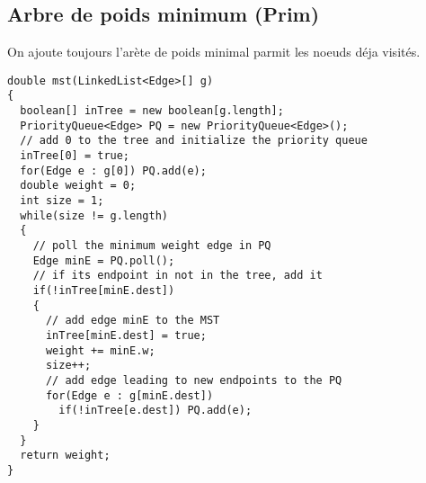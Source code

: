 \subsection{Arbre de poids minimum (Prim)}
On ajoute toujours l'arète de poids minimal parmit les noeuds déja visités.\\

\begin{lstlisting}
double mst(LinkedList<Edge>[] g)
{
  boolean[] inTree = new boolean[g.length];
  PriorityQueue<Edge> PQ = new PriorityQueue<Edge>();
  // add 0 to the tree and initialize the priority queue
  inTree[0] = true;
  for(Edge e : g[0]) PQ.add(e);
  double weight = 0;
  int size = 1;
  while(size != g.length)
  {
    // poll the minimum weight edge in PQ
    Edge minE = PQ.poll();
    // if its endpoint in not in the tree, add it
    if(!inTree[minE.dest])
    {
      // add edge minE to the MST
      inTree[minE.dest] = true;
      weight += minE.w; 
      size++;
      // add edge leading to new endpoints to the PQ
      for(Edge e : g[minE.dest]) 
        if(!inTree[e.dest]) PQ.add(e);
    }
  }
  return weight;
}
\end{lstlisting}